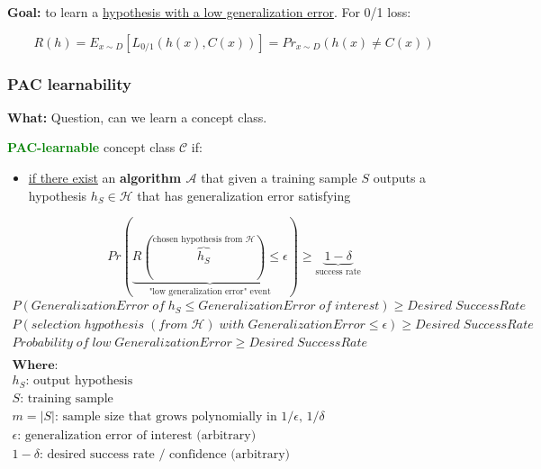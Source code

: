 \documentclass[12pt, a4paper]{article}
\begin{document}
\textbf{Goal:} to learn a \uline{hypothesis with a low generalization error}. For 0/1 loss:

\[R(h) = E_{x \sim D} [L_{0/1}(h(x), C(x))] = Pr_{x \sim D} (h(x) \neq C(x))\]





\subsubsection{PAC learnability
}\label{pac-learnability}

\textbf{What:} Question, can we learn a concept class.

\bigskip \bigskip

\textbf{\textcolor{Green}{PAC-learnable}} concept class $\mathcal{C}$ if:

\begin{itemize}
  \item
     \uline{if there exist} an \textbf{algorithm $\mathcal{A}$} that given a training sample $S$ outputs a hypothesis $h_S \in \mathcal{H}$ that has generalization error satisfying
\end{itemize}

\begin{equation} \label{eq:2}
  Pr(\underbrace{R(\overbrace{h_S}^\text{chosen hypothesis from $\mathcal{H}$}) \leq \epsilon}_\text{"low generalization error" event}) \geq \underbrace{1 - \delta}_\text{success rate}
\end{equation}
\begin{gather*}
  P(GeneralizationError\;of\;h_S \leq GeneralizationError\;of\;interest) \geq Desired\;SuccessRate \\
  P(selection\;hypothesis\;(from \; \mathcal{H})\;with\;GeneralizationError \leq \epsilon) \geq Desired\;SuccessRate \\
  Probability\;of\;low\;GeneralizationError \geq Desired\;SuccessRate \\ \\
  \textbf{Where:} \\
  \textbf{$h_S$: } \text{output hypothesis} \\
  \textbf{$S$: } \text{training sample} \\
  \textbf{$m = |S|$: } \text{sample size that grows polynomially in $1/\epsilon$, $1/\delta$} \\
  \textbf{$\epsilon$: } \text{generalization error of interest (arbitrary)} \\
  \textbf{$1-\delta$: } \text{desired success rate / confidence (arbitrary)} \\
\end{gather*}
\end{document}
